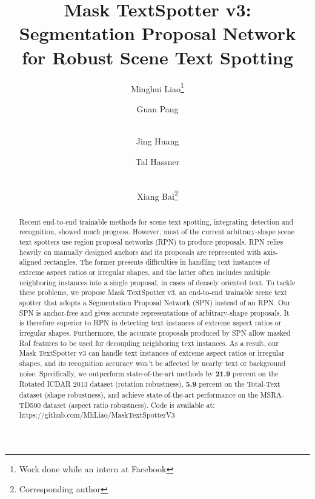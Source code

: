 \documentclass[runningheads]{llncs}
\begin{document}
\pagestyle{headings}
\mainmatter
\def\ECCVSubNumber{100}  

\title{Mask TextSpotter v3: Segmentation Proposal Network for Robust Scene Text Spotting} 

\begin{comment}
\titlerunning{ECCV-20 submission ID \ECCVSubNumber} 
\authorrunning{ECCV-20 submission ID \ECCVSubNumber} 
\author{Anonymous ECCV submission}
\institute{Paper ID \ECCVSubNumber}
\end{comment}


\author{Minghui Liao\thanks{Work done while an intern at Facebook} \and
Guan Pang \and \\
Jing Huang \and
Tal Hassner \and \\
Xiang Bai\thanks{Corresponding author}}
\maketitle

\begin{abstract}
Recent end-to-end trainable methods for scene text spotting, integrating detection and recognition, showed much progress. However, most of the current arbitrary-shape scene text spotters use region proposal networks (RPN) to produce proposals. RPN relies heavily on manually designed anchors and its proposals are represented with axis-aligned rectangles. The former presents difficulties in handling text instances of extreme aspect ratios or irregular shapes, and the latter often includes multiple neighboring instances into a single proposal, in cases of densely oriented text. To tackle these problems, we propose Mask TextSpotter v3, an end-to-end trainable scene text spotter that adopts a Segmentation Proposal Network (SPN) instead of an RPN. Our SPN is anchor-free and gives accurate representations of arbitrary-shape proposals. It is therefore superior to RPN in detecting text instances of extreme aspect ratios or irregular shapes. Furthermore, the accurate proposals produced by SPN allow masked RoI features to be used for decoupling neighboring text instances. As a result, our Mask TextSpotter v3 can handle text instances of extreme aspect ratios or irregular shapes, and its recognition accuracy won't be affected by nearby text or background noise. Specifically, we outperform state-of-the-art methods by \textbf{21.9} percent on the Rotated ICDAR 2013 dataset (rotation robustness), \textbf{5.9} percent on the Total-Text dataset (shape robustness), and achieve state-of-the-art performance on the MSRA-TD500 dataset (aspect ratio robustness). Code is available at: https://github.com/MhLiao/MaskTextSpotterV3 
\end{abstract}
\end{document}
